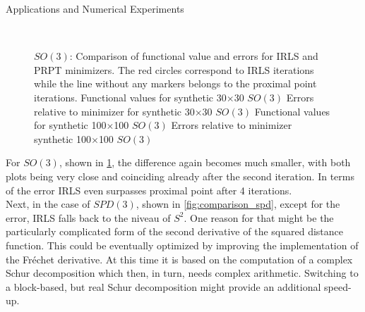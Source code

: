 \begin{chapter}{Applications and Numerical Experiments}
\begin{figure}[h!]
{    }
    \\
    \caption[Comparison IRLS \& PRPT for Euclidean $SO(3)$]{$SO(3)$: Comparison of functional value and errors for IRLS and PRPT minimizers.
	The red circles correspond to IRLS iterations while the line without any markers belongs to the proximal point iterations.
	 Functional values for synthetic 30$\times$30 $SO(3)$
	  Errors relative to minimizer for synthetic 30$\times$30 $SO(3)$
	  Functional values for synthetic 100$\times$100 $SO(3)$
	  Errors relative to minimizer synthetic 100$\times$100 $SO(3)$
	\label{fig:comparison_son}
    }
\end{figure}

For $SO(3)$, shown in \ref{fig:comparison_son}, the difference again becomes much smaller, with both plots being very close and coinciding already after the second iteration. In terms of the
error IRLS even surpasses proximal point after 4 iterations.\\

Next, in the case of $SPD(3)$, shown in \ref{fig:comparison_spd}, except for the error, IRLS falls back to the niveau of $S^2$. One reason for that might be the particularly complicated form of the second
derivative of the squared distance function. This could be eventually optimized by improving the implementation of the Fr\'{e}chet derivative. At this time it is based on
the computation of a complex Schur decomposition which then, in turn, needs complex arithmetic. Switching to a block-based, but real Schur decomposition might provide an additional speed-up.\\


\end{chapter}
